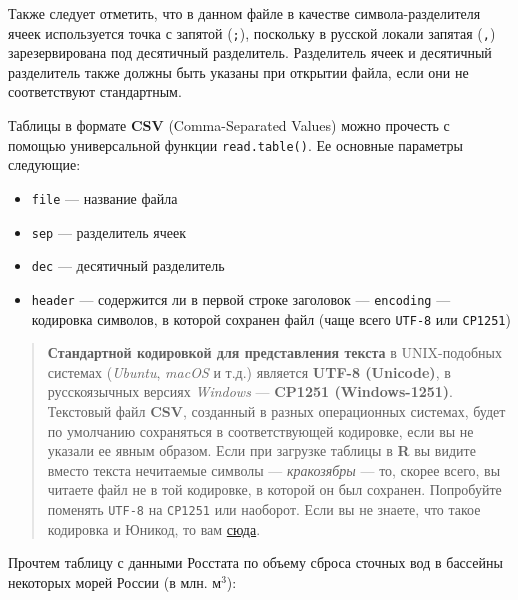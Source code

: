 \documentclass[]{book}
\providecommand{\tightlist}{%
  \setlength{\itemsep}{0pt}\setlength{\parskip}{0pt}}
\begin{document}
Также следует отметить, что в данном файле в качестве
символа-разделителя ячеек используется точка с запятой (\texttt{;}),
поскольку в русской локали запятая (\texttt{,}) зарезервирована под
десятичный разделитель. Разделитель ячеек и десятичный разделитель также
должны быть указаны при открытии файла, если они не соответствуют
стандартным.

Таблицы в формате \textbf{CSV} (Comma-Separated Values) можно прочесть с
помощью универсальной функции \texttt{read.table()}. Ее основные
параметры следующие:

\begin{itemize}
\tightlist
\item
  \texttt{file} --- название файла
\item
  \texttt{sep} --- разделитель ячеек
\item
  \texttt{dec} --- десятичный разделитель
\item
  \texttt{header} --- содержится ли в первой строке заголовок ---
  \texttt{encoding} --- кодировка символов, в которой сохранен файл
  (чаще всего \texttt{UTF-8} или \texttt{CP1251})
\end{itemize}

\begin{quote}
\textbf{Стандартной кодировкой для представления текста} в UNIX-подобных
системах (\emph{Ubuntu}, \emph{macOS} и т.д.) является \textbf{UTF-8
(Unicode)}, в русскоязычных версиях \emph{Windows} --- \textbf{CP1251
(Windows-1251)}. Текстовый файл \textbf{CSV}, созданный в разных
операционных системах, будет по умолчанию сохраняться в соответствующей
кодировке, если вы не указали ее явным образом. Если при загрузке
таблицы в \textbf{R} вы видите вместо текста нечитаемые символы ---
\emph{кракозябры} --- то, скорее всего, вы читаете файл не в той
кодировке, в которой он был сохранен. Попробуйте поменять \texttt{UTF-8}
на \texttt{CP1251} или наоборот. Если вы не знаете, что такое кодировка
и Юникод, то вам
\href{https://ru.wikipedia.org/wiki/Набор_символов}{сюда}.
\end{quote}

Прочтем таблицу с данными Росстата по объему сброса сточных вод в
бассейны некоторых морей России (в млн. м\(^3\)):
\end{document}
